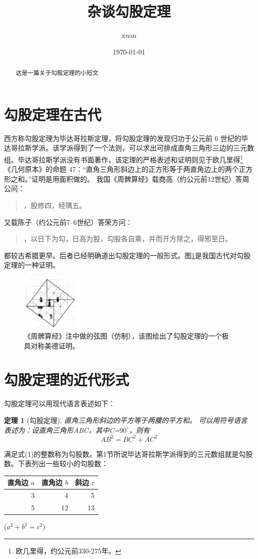 \documentclass[UTF8]{ctexart}
\title{杂谈勾股定理}
\author{xuan}
\date{\today}
\newtheorem{thm}{定理}
\begin{document}
\maketitle
\begin{abstract}
这是一篇关于勾股定理的小短文
\end{abstract}
\tableofcontents
\section{勾股定理在古代}
西方称勾股定理为毕达哥拉斯定理，将勾股定理的发现归功于公元前 6 世纪的毕达哥拉斯学派\cite{Kline}。该学派得到了一个法则，可以求出可排成直角三角形三边的三元数组。毕达哥拉斯学派没有书面著作，该定理的严格表述和证明则见于欧几里得\footnote{欧几里得，约公元前330-275年。}《几何原本》的命题 47：“直角三角形斜边上的正方形等于两直角边上的两个正方形之和。”证明是用面积做的。
我国《周髀算经》载商高（约公元前12世纪）答周公问：
\begin{quote}
，股修四，经隅五。
\end{quote}
又载陈子（约公元前7--6世纪）答荣方问：
\begin{quote}
，以日下为勾，日高为股，勾股各自乘，并而开方除之，得邪至日。
\end{quote}
都较古希腊更早。后者已经明确道出勾股定理的一般形式。图\ref{fig:gougu}是我国古代对勾股定理的一种证明\cite{quanjing}。 
\begin{figure}[ht]
  \centering
  \includegraphics[width=3cm]{gougu.png}
  \caption{《周髀算经》注中做的弦图（仿制），该图给出了勾股定理的一个极具对称美德证明。}
  \label{fig:gougu}
\end{figure}


\section{勾股定理的近代形式}
勾股定理可以用现代语言表述如下：
\begin{thm}[勾股定理]
直角三角形斜边的平方等于两腰的平方和。
可以用符号语言表述为：设直角三角形ABC，其中\angle C=$90^\circ$，则有
\begin{equation}
AB^2 = BC^2 + AC^2
\end{equation}
\end{thm}

满足式(1)的整数称为勾股数。第1节所说毕达哥拉斯学派得到的三元数组就是勾股数。下表列出一些较小的勾股数：
\begin{table}[h]
\begin{tabular}{|rrr|}
\hline
直角边 $a$ & 直角边 $b$ & 斜边 $c$\\
\hline
3 &  4 & 5\\
5 &  12&  13\\
\hline
\end{tabular}%
\qquad
($a^2 + b^2 = c^2$)
\end{table}


\end{document}
